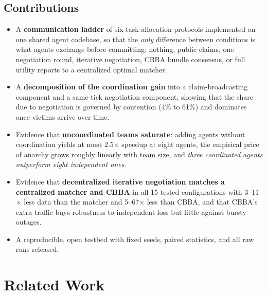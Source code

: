 \documentclass[conference]{IEEEtran}
\begin{document}
\subsection{Contributions}
\begin{itemize}
\item A \textbf{communication ladder} of six task-allocation protocols implemented on one shared agent codebase, so that the \emph{only} difference between conditions is what agents exchange before committing: nothing, public claims, one negotiation round, iterative negotiation, CBBA bundle consensus, or full utility reports to a centralized optimal matcher.
\item A \textbf{decomposition of the coordination gain} into a claim-broadcasting component and a same-tick negotiation component, showing that the share due to negotiation is governed by contention (4\% to 61\%) and dominates once victims arrive over time.
\item Evidence that \textbf{uncoordinated teams saturate}: adding agents without coordination yields at most 2.5$\times$ speedup at eight agents, the empirical price of anarchy grows roughly linearly with team size, and \emph{three coordinated agents outperform eight independent ones}.
\item Evidence that \textbf{decentralized iterative negotiation matches a centralized matcher and CBBA} in all 15 tested configurations with 3--11$\times$ less data than the matcher and 5--67$\times$ less than CBBA, and that CBBA's extra traffic buys robustness to independent loss but little against bursty outages.
\item A reproducible, open testbed with fixed seeds, paired statistics, and all raw runs released.
\end{itemize}

\section{Related Work}
\end{document}
